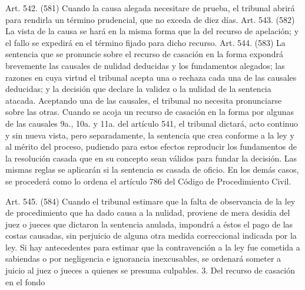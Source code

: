     Art. 542. (581) Cuando la causa alegada necesitare de prueba, el tribunal abrirá para rendirla un término prudencial, que no exceda de diez días.
    Art. 543. (582) La vista de la causa se hará en la misma forma que la del recurso de apelación; y el fallo se expedirá en el término fijado para dicho recurso.
    Art. 544. (583) La sentencia que se pronuncie sobre el recurso de casación en la forma expondrá brevemente las causales de nulidad deducidas y los fundamentos alegados; las razones en cuya virtud el tribunal acepta una o rechaza cada una de las causales deducidas; y la decisión que declare la validez o la nulidad de la sentencia atacada.
    Aceptando una de las causales, el tribunal no necesita pronunciarse sobre las otras.
    Cuando se acoja un recurso de casación en la forma por algunas de las causales 9a., 10a. y 11a. del artículo 541, el tribunal dictará, acto continuo y sin nueva vista, pero separadamente, la sentencia que crea conforme a la ley y al mérito del proceso, pudiendo para estos efectos reproducir los fundamentos de la resolución casada que en su concepto sean válidos para fundar la decisión.
    Las mismas reglas se aplicarán si la sentencia es casada de oficio.
    En los demás casos, se procederá como lo ordena el artículo 786 del Código de Procedimiento Civil.

    Art. 545. (584) Cuando el tribunal estimare que la falta de observancia de la ley de procedimiento que ha dado causa a la nulidad, proviene de mera desidia del juez o jueces que dictaron la sentencia anulada, impondrá a éstos el pago de las costas causadas, sin perjuicio de alguna otra medida correccional indicada por la ley.
    Si hay antecedentes para estimar que la contravención a la ley fue cometida a sabiendas o por negligencia e ignorancia inexcusables, se ordenará someter a juicio al juez o jueces a quienes se presuma culpables.
  3. Del recurso de casación en el fondo

